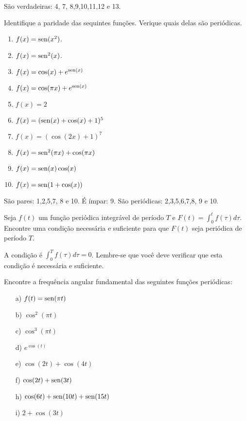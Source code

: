 \begin{Answer} São verdadeiras: 4, 7, 8,9,10,11,12 e 13. 
\end{Answer}


\begin{Exercise}Identifique a paridade das sequintes funções. Verique quais delas são periódicas. 
\begin{enumerate} 
\item $f(x)=\operatorname{sen}(x^2)$.
\item $f(x)=\operatorname{sen}^2(x)$.
\item $f(x)=\cos(x)+e^{\operatorname{sen}(x)}$
\item $f(x)=\cos(\pi x)+e^{\operatorname{sen}(x)}$
\item $f(x)=2$
\item $f(x)=(\operatorname{sen}(x)+\cos(x)+1)^5$
\item $f(x)=(\cos(2x)+1)^7$
\item $f(x)=\operatorname{sen}^2(\pi x)+\cos(\pi x)$
\item $f(x)=\operatorname{sen}(x)\cos(x)$
\item $f(x)=\operatorname{sen}(1+\cos(x))$
\end{enumerate}
\end{Exercise}
\begin{Answer}
São pares: 1,2,5,7, 8 e 10. É ímpar: 9. São periódicas: 2,3,5,6,7,8, 9 e 10. 
\end{Answer}


\begin{Exercise}Seja $f(t)$ um função periódica integrável de período $T$ e $F(t)=\int_0^tf(\tau)d\tau$. Encontre uma condição necessária e suficiente para que $F(t)$ seja periódica de período $T$.
\end{Exercise}
\begin{Answer}
 A condição é $\int_0^Tf(\tau)d\tau=0$. Lembre-se que você deve verificar que esta condição é necessária e suficiente.
\end{Answer}

 
 \begin{Exercise}{\label{freq_fund}} Encontre a frequência angular fundamental das seguintes funções periódicas:
\begin{itemize}
\item [a)] $f(t)= \operatorname{sen}(\pi t)$
\item [b)] $\cos^2(\pi t)$
\item [c)] $\cos^3(\pi t)$
\item [d)] $e^{\cos(t)}$
\item [e)] $\cos(2t)+\cos(4t)$
\item [f)] $\cos(2t)+\operatorname{sen}(3t)$
\item [h)] $\cos(6t)+\operatorname{sen}(10t)+\operatorname{sen}(15t)$
\item [i)] $2+\cos(3t)$
\end{itemize}
\end{Exercise}

